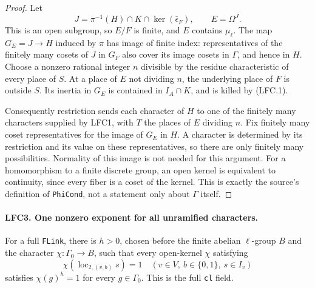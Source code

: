 \documentclass[11pt,a4paper]{article}
\numberwithin{equation}{section}
\theoremstyle{remark}\newtheorem{remark}[theorem]{Remark}
\begin{document}
\begin{proof}
Let
\[
 J=\pi^{-1}(H)\cap K\cap\ker(\bar\epsilon_F),\qquad
 E=\Omega^J.
\]
This is an open subgroup, so \(E/F\) is finite, and \(E\)
contains \(\mu_\ell\).  The map \(G_E=J\to H\) induced by
\(\pi\) has image of finite index: representatives of the
finitely many cosets of \(J\) in \(G_F\) also cover its image
cosets in \(\Gamma\), and hence in \(H\).
Choose a nonzero rational integer \(n\) divisible by the residue
characteristic of every place of \(S\).
At a place of \(E\) not dividing \(n\), the underlying place of
\(F\) is outside \(S\).  Its inertia in \(G_E\) is contained
in \(I_A\cap K\), and is killed by (LFC.1).

Consequently restriction sends each character of \(H\) to one
of the finitely many characters supplied by LFC1, with \(T\)
the places of \(E\) dividing \(n\).  Fix finitely many coset
representatives for the image of \(G_E\) in \(H\).  A character
is determined by its restriction and its value on these
representatives, so there are only finitely many possibilities.
Normality of this image is not needed for this argument.
For a homomorphism to a finite discrete group, an open kernel
is equivalent to continuity, since every fiber is a coset of
the kernel.  This is exactly the source's definition of
\texttt{Phi\allowbreak Cond}, not a statement only about \(\Gamma\) itself.
\end{proof}

\paragraph{LFC3. One nonzero exponent for all unramified characters.}
\label{claim:LFC3}
For a full \texttt{FLink}, there is \(h>0\), chosen before
the finite abelian \(\ell\)-group \(B\) and the character
\(\chi:\Gamma_0\to B\), such that every open-kernel \(\chi\)
satisfying
\[
 \chi(\operatorname{loc}_{2,(v,b)}s)=1
 \quad(v\in V,\ b\in\{0,1\},\ s\in I_v)
                                                        \tag{LFC.5}
\]
satisfies \(\chi(g)^h=1\) for every \(g\in\Gamma_0\).
This is the full \texttt{cl} field.
\end{document}
